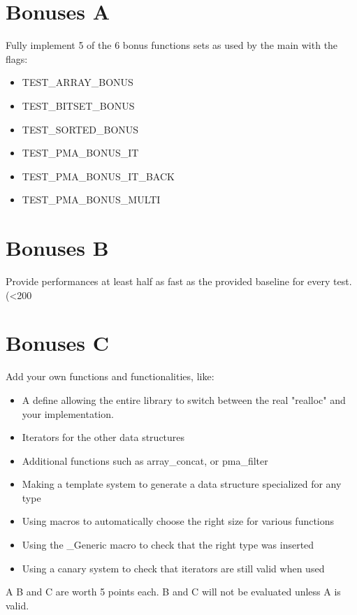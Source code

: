 \documentclass{42-en}
\begin{document}
    \section{Bonuses A}
        Fully implement 5 of the 6 bonus functions sets as used by the main with the flags:
        \begin{itemize}\itemsep1pt
            \item TEST_ARRAY_BONUS
            \item TEST_BITSET_BONUS
            \item TEST_SORTED_BONUS
            \item TEST_PMA_BONUS_IT
            \item TEST_PMA_BONUS_IT_BACK
            \item TEST_PMA_BONUS_MULTI
        \end{itemize}

    \section{Bonuses B}
        Provide performances at least half as fast as the provided baseline for every test. (<200%
    
    \section{Bonuses C}
        Add your own functions and functionalities, like:
        \begin{itemize}\itemsep7pt
            \item A define allowing the entire library to switch between the real "realloc" and your implementation.
            \item Iterators for the other data structures
            \item Additional functions such as array_concat, or pma_filter
            \item Making a template system to generate a data structure specialized for any type
            \item Using macros to automatically choose the right size for various functions
            \item Using the _Generic macro to check that the right type was inserted
            \item Using a canary system to check that iterators are still valid when used
        \end{itemize}

    A B and C are worth 5 points each. B and C will not be evaluated unless A is valid.
\end{document}
